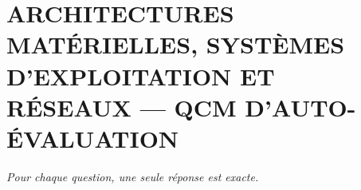
\section*{\textcolor{chapcolor}{\MakeUppercase{Architectures matérielles, systèmes d'exploitation et réseaux — QCM d'auto-évaluation}}}

\begin{center}
\textit{Pour chaque question, une seule réponse est exacte.}
\end{center}

